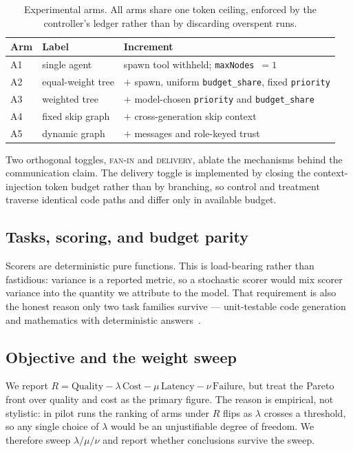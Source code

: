 \documentclass[10pt]{article}
\begin{document}
\begin{table}[t]
\centering
\caption{Experimental arms. All arms share one token ceiling, enforced by the
controller's ledger rather than by discarding overspent runs.}
\label{tab:arms}
\begin{tabular}{llp{7.2cm}}
\toprule
Arm & Label & Increment \\
\midrule
A1 & single agent & spawn tool withheld; \texttt{maxNodes}~$=1$ \\
A2 & equal-weight tree & $+$ spawn, uniform \texttt{budget\_share}, fixed \texttt{priority} \\
A3 & weighted tree & $+$ model-chosen \texttt{priority} and \texttt{budget\_share} \\
A4 & fixed skip graph & $+$ cross-generation skip context \\
A5 & dynamic graph & $+$ messages and role-keyed trust \\
\bottomrule
\end{tabular}
\end{table}

Two orthogonal toggles, \textsc{fan-in} and \textsc{delivery}, ablate the
mechanisms behind the communication claim. The delivery toggle is implemented by
closing the context-injection token budget rather than by branching, so control
and treatment traverse identical code paths and differ only in available budget.

\subsection{Tasks, scoring, and budget parity}
\label{sec:graph-scoring}

Scorers are deterministic pure functions. This is load-bearing rather than
fastidious: variance is a reported metric, so a stochastic scorer would mix
scorer variance into the quantity we attribute to the model. That requirement is
also the honest reason only two task families survive --- unit-testable code
generation~\citep{chen2021humaneval,liu2023evalplus} and mathematics with
deterministic answers~\citep{cobbe2021gsm8k}.

\subsection{Objective and the weight sweep}

We report $R = \mathrm{Quality} - \lambda\,\mathrm{Cost} - \mu\,\mathrm{Latency}
- \nu\,\mathrm{Failure}$, but treat the Pareto front over quality and cost as
the primary figure. The reason is empirical, not stylistic: in pilot runs the
ranking of arms under $R$ flips as $\lambda$ crosses a threshold, so any single
choice of $\lambda$ would be an unjustifiable degree of freedom. We therefore
sweep $\lambda/\mu/\nu$ and report whether conclusions survive the sweep.
\end{document}
